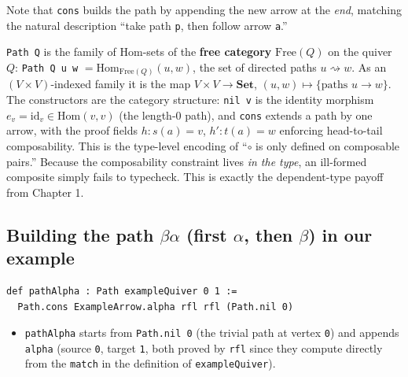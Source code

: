 Note that \texttt{cons} builds the path by appending the new arrow at the \emph{end}, matching the natural description ``take path \texttt{p}, then follow arrow \texttt{a}.''

\begin{mathreading}

\texttt{Path Q} is the family of Hom-sets of the \textbf{free category} \(\mathrm{Free}(Q)\) on the quiver \(Q\): \texttt{Path Q u w} \(= \mathrm{Hom}_{\mathrm{Free}(Q)}(u, w)\), the set of directed paths \(u \rightsquigarrow w\). As an \((V\times V)\)-indexed family it is the map \(V \times V \to \mathbf{Set}\), \((u,w) \mapsto \{\text{paths } u \to w\}\). The constructors are the category structure: \texttt{nil v} is the identity morphism \(e_v = \mathrm{id}_v \in \mathrm{Hom}(v,v)\) (the length-\(0\) path), and \texttt{cons} extends a path by one arrow, with the proof fields \(h : s(a) = v\), \(h' : t(a) = w\) enforcing head-to-tail composability. This is the type-level encoding of ``\(\circ\) is only defined on composable pairs.'' Because the composability constraint lives \emph{in the type}, an ill-formed composite simply fails to typecheck. This is exactly the dependent-type payoff from Chapter 1.

\end{mathreading}

\subsection{\texorpdfstring{Building the path \(\beta\alpha\) (first \(\alpha\), then \(\beta\)) in our example}{Building the path \textbackslash beta\textbackslash alpha (first \textbackslash alpha, then \textbackslash beta) in our example}}\label{sec:11-path-algebras:04-paths-as-inductive-type:2}

\begin{lstlisting}
def pathAlpha : Path exampleQuiver 0 1 :=
  Path.cons ExampleArrow.alpha rfl rfl (Path.nil 0)
\end{lstlisting}

\begin{itemize}
\tightlist
\item
  \texttt{pathAlpha} starts from \texttt{Path.nil 0} (the trivial path at vertex \texttt{0}) and appends \texttt{alpha} (source \texttt{0}, target \texttt{1}, both proved by \texttt{rfl} since they compute directly from the \texttt{match} in the definition of \texttt{exampleQuiver}).
\end{itemize}


